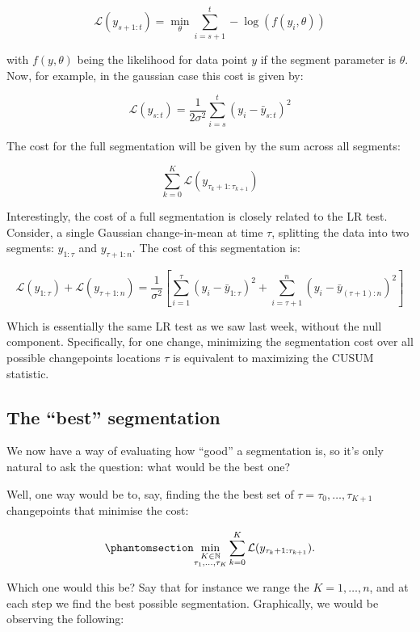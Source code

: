 \documentclass[
  letterpaper,
  DIV=11,
  numbers=noendperiod]{scrreprt}
\begin{document}
\[
    \mathcal{L}(y_{s+1:t}) = \min_\theta \sum_{i = s + 1}^{t} - \log(f(y_i, \theta))
\]

with \(f(y, \theta)\) being the likelihood for data point \(y\) if the
segment parameter is \(\theta\). Now, for example, in the gaussian case
this cost is given by:

\[
\mathcal{L}(y_{s:t}) = \frac{1}{2\sigma^2}  \sum_{i = s}^{t} \left ( y_i - \bar{y}_{s:t} \right)^2
\]

The cost for the full segmentation will be given by the sum across all
segments:

\[
\sum_{k = 0}^K \mathcal{L}(y_{\tau_k+1:\tau_{k+1}})
\]

Interestingly, the cost of a full segmentation is closely related to the
LR test. Consider, a single Gaussian change-in-mean at time \(\tau\),
splitting the data into two segments: \(y_{1:\tau}\) and
\(y_{\tau+1:n}\). The cost of this segmentation is:

\[
\mathcal{L}(y_{1:\tau}) + \mathcal{L}(y_{\tau+1:n}) = \frac{1}{\sigma^2} \left[\sum_{i=1}^{\tau} (y_i - \bar{y}_{1:\tau})^2 + \sum_{i=\tau+1}^{n} (y_i - \bar{y}_{(\tau+1):n})^2 \right]
\]

Which is essentially the same LR test as we saw last week, without the
null component. Specifically, for one change, minimizing the
segmentation cost over all possible changepoints locations \(\tau\) is
equivalent to maximizing the CUSUM statistic.

\subsection{The ``best'' segmentation}\label{the-best-segmentation}

We now have a way of evaluating how ``good'' a segmentation is, so it's
only natural to ask the question: what would be the best one?

Well, one way would be to, say, finding the the best set of
\(\tau = \tau_0, \dots, \tau_{K+1}\) changepoints that minimise the
cost:

\begin{equation}\phantomsection\label{eq-segment_cost}{
\min_{\substack{K \in \mathbb{N}\\ \tau_1, \dots, \tau_K}} \sum_{k = 0}^K \mathcal{L}(y_{\tau_k+1:\tau_{k+1}}).
}\end{equation}

Which one would this be? Say that for instance we range the
\(K = 1, \dots, n\), and at each step we find the best possible
segmentation. Graphically, we would be observing the following:
\end{document}
